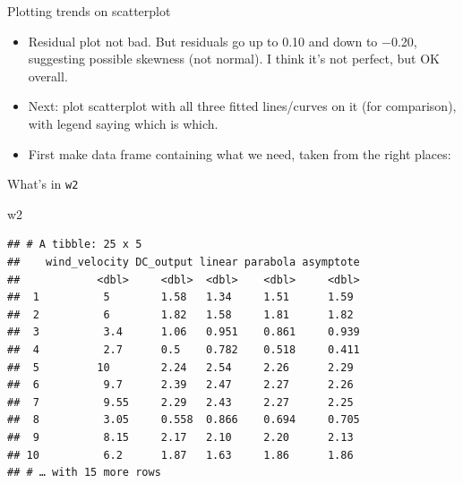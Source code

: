 \documentclass[
  ignorenonframetext,
]{beamer}
\newenvironment{Shaded}{\begin{snugshade}}{\end{snugshade}}
\newcommand{\DataTypeTok}[1]{\textcolor[rgb]{0.13,0.29,0.53}{#1}}
\newcommand{\FloatTok}[1]{\textcolor[rgb]{0.00,0.00,0.81}{#1}}
\newcommand{\KeywordTok}[1]{\textcolor[rgb]{0.13,0.29,0.53}{\textbf{#1}}}
\newcommand{\NormalTok}[1]{#1}
\newcommand{\OperatorTok}[1]{\textcolor[rgb]{0.81,0.36,0.00}{\textbf{#1}}}
\newcommand{\StringTok}[1]{\textcolor[rgb]{0.31,0.60,0.02}{#1}}
\providecommand{\tightlist}{%
  \setlength{\itemsep}{0pt}\setlength{\parskip}{0pt}}
\begin{document}
\begin{frame}[fragile]{Plotting trends on scatterplot}
\protect\hypertarget{plotting-trends-on-scatterplot}{}

\begin{itemize}
\tightlist
\item
  Residual plot not bad. But residuals go up to 0.10 and down to −0.20,
  suggesting possible skewness (not normal). I think it's not perfect,
  but OK overall.
\item
  Next: plot scatterplot with all three fitted lines/curves on it (for
  comparison), with legend saying which is which.
\item
  First make data frame containing what we need, taken from the right
  places:
\end{itemize}

\begin{Shaded}
\end{Shaded}

\end{frame}

\begin{frame}[fragile]{What's in \texttt{w2}}
\protect\hypertarget{whats-in-w2}{}

\begin{Shaded}
\begin{Highlighting}[]
\NormalTok{w2}
\end{Highlighting}
\end{Shaded}

\begin{verbatim}
## # A tibble: 25 x 5
##    wind_velocity DC_output linear parabola asymptote
##            <dbl>     <dbl>  <dbl>    <dbl>     <dbl>
##  1          5        1.58   1.34     1.51      1.59 
##  2          6        1.82   1.58     1.81      1.82 
##  3          3.4      1.06   0.951    0.861     0.939
##  4          2.7      0.5    0.782    0.518     0.411
##  5         10        2.24   2.54     2.26      2.29 
##  6          9.7      2.39   2.47     2.27      2.26 
##  7          9.55     2.29   2.43     2.27      2.25 
##  8          3.05     0.558  0.866    0.694     0.705
##  9          8.15     2.17   2.10     2.20      2.13 
## 10          6.2      1.87   1.63     1.86      1.86 
## # … with 15 more rows
\end{verbatim}

\end{frame}
\end{document}
